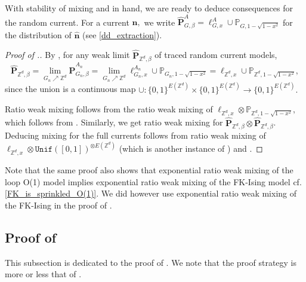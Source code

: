 \documentclass[article,11pt,reqno]{amsart}
\begin{document}
With stability of mixing and  in hand, we are ready to deduce consequences for the random current. For a current $\mathbf{n},$ we write $\widehat{\mathbf{P}}^A_{G,\beta}=\ell^{A}_{G,x}\cup\mathbb{P}_{G,1-\sqrt{1-x^2}}$ for the distribution of $\hat{\mathbf{n}}$ (see \eqref{dd_extraction}).
\begin{proof}[Proof of .]
By , for any weak limit $\widehat{\mathbf{P}}_{\mathbb{Z}^d,\beta}$ of traced random current models, $$\widehat{\mathbf{P}}_{\mathbb{Z}^d,\beta}=\lim_{G_n\nearrow \mathbb{Z}^d} \widehat{\mathbf{P}}^{A_n}_{G_n,\beta}=\lim_{G_n\nearrow \mathbb{Z}^d} \ell^{A_n}_{G_n,x}\cup \mathbb{P}_{G_n,1 - \sqrt{1-x^2}} = \ell_{\mathbb{Z}^d,x}\cup \mathbb{P}_{\mathbb{Z}^d,1 - \sqrt{1-x^2}},$$
since the union is a continuous map $\cup:\{0,1\}^{E(\mathbb{Z}^d)}\times \{0,1\}^{E(\mathbb{Z}^d)}\to \{0,1\}^{E(\mathbb{Z}^d)}.$

Ratio weak mixing follows from the ratio weak mixing of $\ell_{\mathbb{Z}^d,x}\otimes \mathbb{P}_{\mathbb{Z}^d,1 - \sqrt{1-x^2}},$ which follows from . Similarly, we get ratio weak mixing for $\widehat{\mathbf{P}}_{\mathbb{Z}^d,\beta}\otimes \widehat{\mathbf{P}}_{\mathbb{Z}^d,\beta}$. Deducing mixing for the full currents follows from ratio weak mixing of $\ell_{\mathbb{Z}^d,x}\otimes \mathtt{Unif}([0,1])^{\otimes E(\mathbb{Z}^d)}$ (which is another instance of ) and  .
\end{proof}

Note that the same proof also shows that exponential ratio weak mixing of the loop O(1) model implies exponential ratio weak mixing of the FK-Ising model cf. \eqref{FK_is_sprinkled_O(1)}. We did however use exponential ratio weak mixing of the FK-Ising in the proof of . 





\subsection{Proof of }
This subsection is dedicated to the proof of . 
We note that the proof strategy is more or less that of \cite[Theorem 3.1]{Pis96}. 
\end{document}
